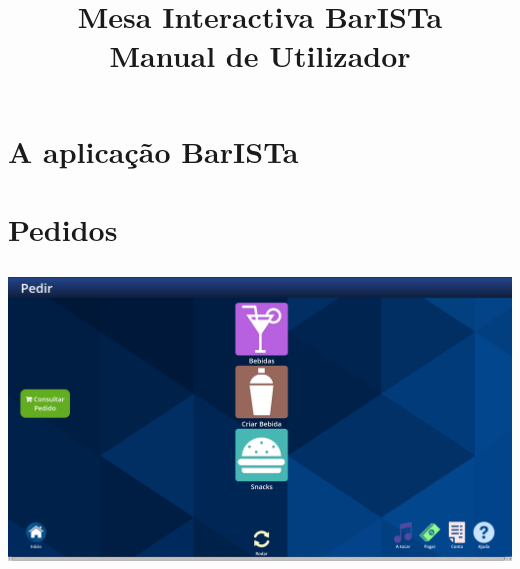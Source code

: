 \documentclass{article}
\title{\vspace{5cm}\textbf{Mesa Interactiva BarISTa}\\Manual de Utilizador}
\begin{document}
\maketitle
\newpage

\tableofcontents
\newpage

\section{A aplicação BarISTa}
\section{Pedidos}
\includegraphics[width=15cm, height=8cm]{user_manual_images/order_menu.png}
\end{document}
